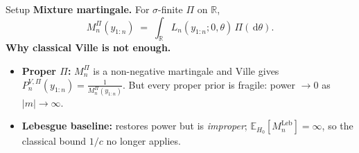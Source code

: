 \documentclass[final]{beamer}
\newcommand{\E}{\mathbb{E}}
\newcommand{\dd}{\,\mathrm{d}}
\newcommand{\Leb}{\mathrm{Leb}}
\newlength{\colwidth}
\begin{document}
\begin{frame}[t]
\begin{columns}[t]
\begin{column}{\colwidth}
\begin{block}{Setup}
    \textbf{Mixture martingale.} For $\sigma$-finite $\Pi$ on $\mathbb R$,
    \[
      M_n^{\Pi}(y_{1:n}) \;=\; \int_{\mathbb R} L_n(y_{1:n};0,\theta)\,\Pi(\dd\theta).
    \]
    \textbf{Why classical Ville is not enough.}
\begin{itemize}
  \setlength\itemsep{0.08cm}
  \item \textbf{Proper $\Pi$:} $M_n^\Pi$ is a non-negative martingale and Ville gives $P_n^{V,\Pi}(y_{1:n})=\frac{1}{M_n^\Pi(y_{1:n})}$. But \alert{every proper prior is fragile}: power $\to 0$ as $|m|\to\infty$.
  \item \textbf{Lebesgue baseline:} restores power but is \emph{improper}; $\E_{H_0}[M_n^{\Leb}]=\infty$, so the classical bound $1/c$ no longer applies.
\end{itemize}

  \end{block}
\end{column}


\end{columns}
\end{frame}
\end{document}

